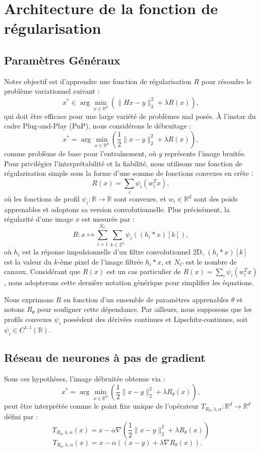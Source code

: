 \documentclass[a4paper, 12pt]{report} %
\begin{document}
\section{Architecture de la fonction de régularisation}
\subsection{Paramètres Généraux}

Notre objectif est d'apprendre une fonction de régularisation \( R \) pour résoudre le problème variationnel suivant :  
\[
x^* \in \arg \min_{x \in \mathbb{R}^d} \left( \| Hx - y \|_2^2 + \lambda R(x) \right),
\]
qui doit être efficace pour une large variété de problèmes mal posés. À l'instar du cadre Plug-and-Play (PnP), nous considérons le débruitage :  
\[
x^* = \arg \min_{x \in \mathbb{R}^d} \left( \frac{1}{2} \| x - y \|_2^2 + \lambda R(x) \right),
\]
comme problème de base pour l'entraînement, où \( y \) représente l'image bruitée. Pour privilégier l'interprétabilité et la fiabilité, nous utilisons une fonction de régularisation simple sous la forme d’une somme de fonctions convexes en crête :  
\[
R(x) = \sum_{i} \psi_i(w_i^T x),
\]
où les fonctions de profil \( \psi_i : \mathbb{R} \rightarrow \mathbb{R} \) sont convexes, et \( w_i \in \mathbb{R}^d \) sont des poids apprenables et adoptons sa version convolutionnelle. Plus précisément, la régularité d'une image \( x \) est mesurée par :
\[
R: x \mapsto \sum_{i=1}^{N_C} \sum_{k \in \mathbb{Z}^2} \psi_i \left( (h_i * x)[k] \right),
\]
où \( h_i \) est la réponse impulsionnelle d'un filtre convolutionnel 2D, \( (h_i * x)[k] \) est la valeur du \( k \)-ème pixel de l'image filtrée \( h_i * x \), et \( N_C \) est le nombre de canaux. Considérant que \( R(x) \) est un cas particulier de \( R(x) = \sum_{i} \psi_i(w_i^T x) \), nous adopterons cette dernière notation générique pour simplifier les équations.

Nous exprimons \( R \) en fonction d’un ensemble de paramètres apprenables \( \theta \) et notons \( R_\theta \) pour souligner cette dépendance. Par ailleurs, nous supposons que les profils convexes \( \psi_i \) possèdent des dérivées continues et Lipschitz-continues, soit \( \psi_i \in C^{1,1}(\mathbb{R}) \).

\subsection{Réseau de neurones à pas de gradient}

Sous ces hypothèses, l’image débruitée obtenue via :  
\[
x^* = \arg \min_{x \in \mathbb{R}^d} \left( \frac{1}{2} \| x - y \|_2^2 + \lambda R_\theta(x) \right),
\]
peut être interprétée comme le point fixe unique de l’opérateur \( T_{R_\theta,\lambda,\alpha} : \mathbb{R}^d \to \mathbb{R}^d \) défini par :  
\[
T_{R_\theta,\lambda,\alpha}(x) = x - \alpha \nabla \left( \frac{1}{2} \| x - y \|_2^2 + \lambda R_\theta(x) \right)
\]
\vspace{-0.6 cm}
\[
T_{R_\theta,\lambda,\alpha}(x) = x - \alpha \left( (x - y) + \lambda \nabla R_\theta(x) \right). \quad
\]
\end{document}
